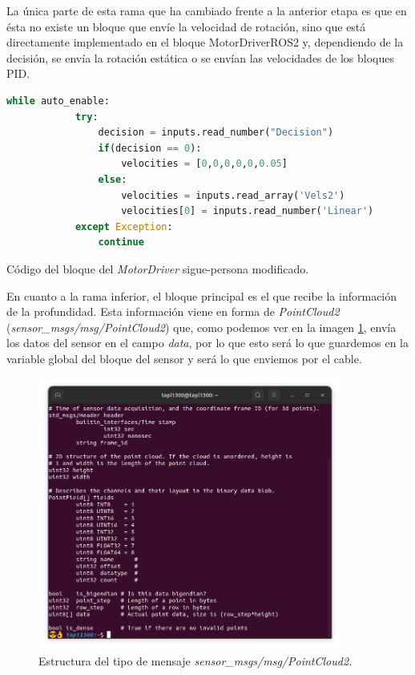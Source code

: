 La única parte de esta rama que ha cambiado frente a la anterior etapa es que en ésta no existe un bloque que envíe la velocidad de rotación, sino que está
directamente implementado en el bloque MotorDriverROS2 y, dependiendo de la decisión, se envía la rotación estática o se envían
las velocidades de los bloques PID.

\begin{code}[H]
    \begin{lstlisting}[language=python]
        while auto_enable:
            try:
                decision = inputs.read_number("Decision")
                if(decision == 0):
                    velocities = [0,0,0,0,0,0.05]
                else:
                    velocities = inputs.read_array('Vels2')
                    velocities[0] = inputs.read_number('Linear')
            except Exception:
                continue

    \end{lstlisting}
    \caption[Código bloque MotorDriver sigue-persona modificado]{Código del bloque del \textit{MotorDriver} sigue-persona modificado.}
    \label{cod:MotorDriver_FP_final}
\end{code}

En cuanto a la rama inferior, el bloque principal es el que recibe la información de la profundidad. Esta información viene en forma
de \textit{PointCloud2} (\textit{sensor\_msgs/msg/PointCloud2}) que, como  podemos ver en la imagen \ref{fig:PC2_struct}, envía los datos del sensor en el
campo \textit{data}, por lo que esto será lo que guardemos en la variable global del bloque del sensor y será lo que enviemos por el cable.\\

\begin{figure} [H]
    \begin{center}
        \includegraphics[width=10cm]{figs/c5/PointCloud2_data.png}
    \end{center}
    \caption[Estructura mensaje PointCloud2]{Estructura del tipo de mensaje \textit{sensor\_msgs/msg/PointCloud2.}}
    \label{fig:PC2_struct}
\end{figure}


